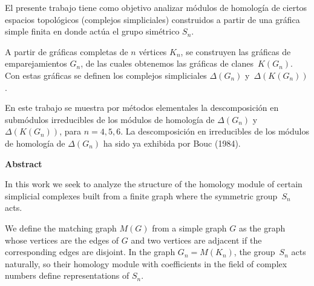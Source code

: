 \documentclass[12pt]{book}
\theoremstyle{definition}
\newcounter{in}
\newcounter{ini}
\begin{document}
El presente trabajo tiene como objetivo analizar módulos de homología
de ciertos espacios topológicos (complejos simpliciales) construidos a partir de una gráfica
simple finita en donde actúa el grupo simétrico $S_{n}$.

A partir de gráficas completas de $n$ vértices $K_{n}$, se construyen
las gráficas de emparejamientos $G_{n}$, de las cuales obtenemos las
gráficas de clanes~$K(G_{n})$. Con estas gráficas se definen los
complejos simpliciales $\Delta(G_{n})$ y~$\Delta(K(G_{n}))$. 

En este trabajo se muestra por métodos elementales la descomposición en submódulos irreducibles
de los módulos de homología de $\Delta(G_{n})$ y $\Delta(K(G_{n}))$,
para $n=4,5,6$. La descomposición en irreducibles de los
 módulos de homología de $\Delta(G_{n})$ ha sido ya exhibida
por Bouc (1984).


\vspace{2cm}

\begin{flushleft}
  {\bfseries\Large Abstract}
\end{flushleft}

In this work we seek to analyze the structure of the homology module of
certain simplicial complexes built from a finite graph where the
symmetric group~$S_{n}$ acts. 

We define the matching graph $M(G)$ from a simple graph $G$ as 
the graph whose vertices are the edges of $G$ and two vertices are
adjacent if the corresponding edges are disjoint. In the graph
$G_{n}=M(K_{n})$, the group~$S_{n}$ acts naturally, so their homology module
with coefficients in the field of complex numbers define representations of $S_{n}$. 
\end{document}
